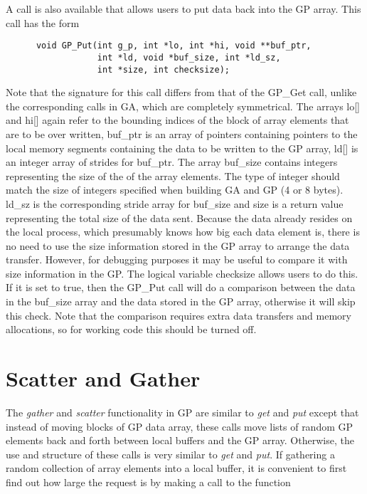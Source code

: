 A call is also available that allows users to put data back into the GP array.
This call has the form

\begin{verbatim}
      void GP_Put(int g_p, int *lo, int *hi, void **buf_ptr,
                  int *ld, void *buf_size, int *ld_sz,
                  int *size, int checksize);
\end{verbatim}

\noindent
Note that the signature for this call differs from that of the GP\_Get call,
unlike the corresponding calls in GA, which are completely symmetrical. The
arrays lo[] and hi[] again refer to the bounding indices of the block of array
elements that are to be over written, buf\_ptr is an array of pointers
containing pointers to the local memory segments containing the data to be
written to the GP array, ld[] is an integer array of strides for buf\_ptr. The
array buf\_size contains integers representing the size of the of the array
elements. The type of integer should match the size of integers specified when
building GA and GP (4 or 8 bytes). ld\_sz is the corresponding stride array for
buf\_size and size is a return value representing the total size of the data
sent. Because the data already resides on the local process, which presumably
knows how big each data element is, there is no need to use the size information
stored in the GP array to arrange the data transfer. However,
for debugging purposes it may be useful to compare it with size information in
the GP. The logical variable checksize allows users to do this. If it is set to
true, then the GP\_Put call will do a comparison between the data in the
buf\_size array and the data stored in the GP array, otherwise it will skip this
check. Note that the comparison requires extra data transfers and memory
allocations, so for working code this should be turned off.

\section{Scatter and Gather}

The \emph{gather} and \emph{scatter} functionality in GP are similar to
\emph{get} and \emph{put} except that instead of moving blocks of GP data array,
these calls move lists of random GP elements back and forth between local
buffers and the GP array. Otherwise, the use and structure of these calls is
very similar to \emph{get} and \emph{put}. If gathering a random collection of
array elements into a local buffer, it is convenient to first find out how large
the request is by making a call to the function

